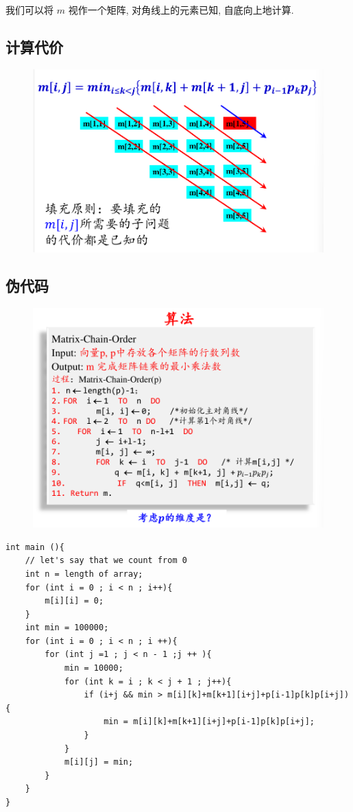 \documentclass[a4paper, 10pt]{ctexart} %
\begin{document}
我们可以将 $m$ 视作一个矩阵, 对角线上的元素已知, 自底向上地计算. 
\subsection{计算代价}
\begin{figure}[H]
    \centering
    \includegraphics[scale =0.5]{7.png}
\end{figure}
\subsection{伪代码}
\begin{figure}[H]
    \centering
    \includegraphics[scale =0.5]{8.png}
\end{figure}

\begin{verbatim}
int main (){
    // let's say that we count from 0
    int n = length of array;
    for (int i = 0 ; i < n ; i++){
        m[i][i] = 0;
    }
    int min = 100000;
    for (int i = 0 ; i < n ; i ++){
        for (int j =1 ; j < n - 1 ;j ++ ){
            min = 10000;
            for (int k = i ; k < j + 1 ; j++){
                if (i+j && min > m[i][k]+m[k+1][i+j]+p[i-1]p[k]p[i+j]){
                    min = m[i][k]+m[k+1][i+j]+p[i-1]p[k]p[i+j];
                }
            }
            m[i][j] = min;
        }
    }
}
\end{verbatim}
\end{document}
